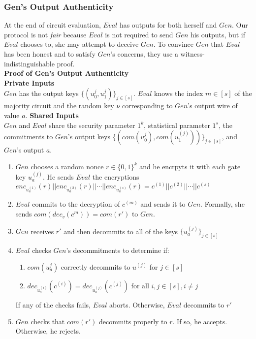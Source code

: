 \documentclass{article}
\begin{document}
\subsubsection{Gen's Output Authenticity} \label{sec:gen-output-auth}
At the end of circuit evaluation, $Eval$ has outputs for both herself and $Gen$. Our protocol is not \emph{fair} because $Eval$ is not required to send $Gen$ his outputs, but if $Eval$ chooses to, she may attempt to deceive $Gen$. To convince $Gen$ that $Eval$ has been honest and to satisfy $Gen$'s concerns, they use a witness-indistinguishable proof.  \\

{\large \textbf{Proof of Gen's Output Authenticity}} \\ 
\textbf{Private Inputs}\\
$Gen$ has the output keys $\{(u_{0}^{j},u_{1}^{j})\}_{j \in [s]}$. $Eval$ knows the index $m \in [s]$ of the majority circuit and the random key $\nu$ corresponding to $Gen$'s output wire of value $a$. 
\textbf{Shared Inputs}\\
$Gen$ and $Eval$ share the security parameter $1^{k}$, statistical parameter $1^{s}$, the commitments to $Gen$'s output keys $\{(com(u_{0}^{j}), com(u_{1}^{(j)}))\}_{j \in [s]}$, and $Gen$'s output $a$.

\begin{enumerate}
	\item $Gen$ chooses a random nonce $r \in \{0,1\}^{k}$ and he encrpyts it with each gate key $u_{a}^{(j)}$. He sends $Eval$ the encryptions $enc_{u_{a}^{(1)}}(r) || enc_{u_{a}^{(2)}}(r) || \cdots || enc_{u_{a}^{(s)}}(r) = c^{(1)} || c^{(2)} || \cdots || c^{(s)} $
	\item $Eval$ commits to the decryption of $c^{(m)}$ and sends it to $Gen$. Formally, she sends $com(dec_{v}(c^{m})) = com(r')$ to $Gen$.
	\item $Gen$ receives $r'$ and then decommits to all of the keys $\{u_{a}^{(j)}\}_{j \in [s]}$
	\item $Eval$ checks $Gen$'s decommitments to determine if:
	\begin{enumerate}[label=(\alph*)]
		\item $com(u_{a}^{j})$ correctly decommits to $u^{(j)}$ for $j \in [s]$
		\item $dec_{u_{a}^{(i)}}(c^{(i)}) = dec_{u_{a}^{(j)}}(c^{(j)}) \text{ for all } i,j \in [s], i \neq j$
	\end{enumerate}
	If any of the checks fails, $Eval$ aborts. Otherwise, $Eval$ decommits to $r'$
	\item $Gen$ checks that $com(r')$ decommits properly to $r$. If so, he accepts. Otherwise, he rejects.
\end{enumerate}
\end{document}
